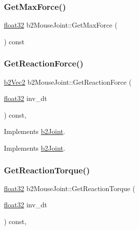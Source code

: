 \mbox{\label{classb2_mouse_joint_a61c9fbd78498d3484f824876654eb015}} 
\subsubsection{\texorpdfstring{GetMaxForce()}{GetMaxForce()}}
{\footnotesize\ttfamily \mbox{\hyperlink{b2_settings_8h_aacdc525d6f7bddb3ae95d5c311bd06a1}{float32}} b2\+Mouse\+Joint\+::\+Get\+Max\+Force (\begin{DoxyParamCaption}{ }\end{DoxyParamCaption}) const}

\mbox{\label{classb2_mouse_joint_a1af7bb9f41076b29a1ddefd7b6c2f27b}} 
\subsubsection{\texorpdfstring{GetReactionForce()}{GetReactionForce()}}
{\footnotesize\ttfamily \mbox{\hyperlink{structb2_vec2}{b2\+Vec2}} b2\+Mouse\+Joint\+::\+Get\+Reaction\+Force (\begin{DoxyParamCaption}\item[{\mbox{\hyperlink{b2_settings_8h_aacdc525d6f7bddb3ae95d5c311bd06a1}{float32}}}]{inv\+\_\+dt }\end{DoxyParamCaption}) const\hspace{0.3cm}{\ttfamily [override]}, {\ttfamily [virtual]}}



Implements \mbox{\hyperlink{classb2_joint}{b2\+Joint}}. 



Implements \mbox{\hyperlink{classb2_joint_a7e0eddefb9b69ad050b8ef6425838a74}{b2\+Joint}}.

\mbox{\label{classb2_mouse_joint_aa9ea0d1b1aa2db5be3ed63392a7e28a2}} 
\subsubsection{\texorpdfstring{GetReactionTorque()}{GetReactionTorque()}}
{\footnotesize\ttfamily \mbox{\hyperlink{b2_settings_8h_aacdc525d6f7bddb3ae95d5c311bd06a1}{float32}} b2\+Mouse\+Joint\+::\+Get\+Reaction\+Torque (\begin{DoxyParamCaption}\item[{\mbox{\hyperlink{b2_settings_8h_aacdc525d6f7bddb3ae95d5c311bd06a1}{float32}}}]{inv\+\_\+dt }\end{DoxyParamCaption}) const\hspace{0.3cm}{\ttfamily [override]}, {\ttfamily [virtual]}}



